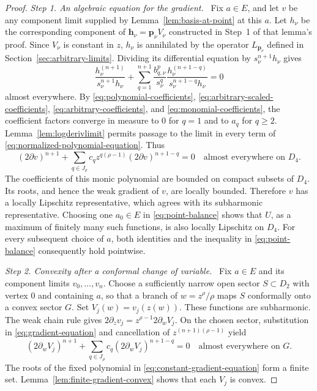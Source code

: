 \documentclass[11pt,letterpaper,reqno]{amsart}
\theoremstyle{remark}
\numberwithin{equation}{section}
\newcommand{\pv}{\bm p}
\newcommand{\hv}{\bm h}
\newcommand{\step}[1]{\medskip\noindent\emph{#1}\ }
\begin{document}
\begin{proof}
\step{Step 1. An algebraic equation for the gradient.}
Fix $a\in E$, and let $v$ be any component limit supplied by
Lemma~\ref{lem:basis-at-point} at this $a$. Let $h_\nu$ be the
corresponding component of $\hv_\nu=\pv_\nu V_\nu$ constructed in
Step~1 of that lemma's proof. Since $V_\nu$ is constant in $z$,
$h_\nu$ is annihilated by the operator $L_{\pv_\nu}$ defined in
Section~\ref{sec:arbitrary-limits}. Dividing its
differential equation by $s_\nu^{n+1} h_\nu$ gives
\begin{equation}\label{eq:normalized-polynomial-equation}
 \frac{h_\nu^{(n+1)}}{s_\nu^{n+1} h_\nu}
 +\sum_{q=1}^{n+1}\frac{b_{q,\nu}^p}{s_\nu^q}
                  \frac{h_\nu^{(n+1-q)}}{s_\nu^{n+1-q}h_\nu}=0
\end{equation}
almost everywhere. By \eqref{eq:polynomial-coefficients},
\eqref{eq:arbitrary-scaled-coefficients},
\eqref{eq:arbitrary-coefficients}, and
\eqref{eq:monomial-coefficients}, the coefficient factors converge in
measure to $0$ for $q=1$ and to $a_q$ for $q\geq2$.
Lemma~\ref{lem:logderivlimit} permits passage to the limit in every term
of \eqref{eq:normalized-polynomial-equation}. Thus
\begin{equation}\label{eq:gradient-equation}
 (2\partial v)^{n+1}+
 \sum_{q\in J_\rho}c_qz^{q(\rho-1)}(2\partial v)^{n+1-q}=0
 \quad\text{almost everywhere on }D_4.
\end{equation}
The coefficients of this monic polynomial are bounded on compact
subsets of $D_4$. Its roots, and hence the weak gradient of $v$, are
locally bounded. Therefore $v$ has a locally Lipschitz representative,
which agrees with its subharmonic representative. Choosing one
$a_0\in E$ in \eqref{eq:point-balance} shows that $U$, as a maximum of
finitely many such functions, is also locally Lipschitz on $D_4$.
For every subsequent choice of $a$, both identities and the inequality
in \eqref{eq:point-balance} consequently hold pointwise.

\step{Step 2. Convexity after a conformal change of variable.}
Fix $a\in E$ and its component limits $v_0,\ldots,v_n$.
Choose a sufficiently narrow open sector $S\subset D_2$ with vertex $0$
and containing $a$, so that a branch of $w=z^\rho/\rho$ maps $S$
conformally onto a convex sector $G$. Set $V_j(w)=v_j(z(w))$.
These functions are subharmonic. The weak chain rule gives
$2\partial_zv_j=z^{\rho-1}2\partial_wV_j$.
On the chosen sector, substitution in \eqref{eq:gradient-equation}
and cancellation of $z^{(n+1)(\rho-1)}$ yield
\begin{equation}\label{eq:constant-gradient-equation}
 (2\partial_wV_j)^{n+1}+\sum_{q\in J_\rho}c_q(2\partial_wV_j)^{n+1-q}=0
 \quad\text{almost everywhere on }G.
\end{equation}
The roots of the fixed polynomial in
\eqref{eq:constant-gradient-equation} form a finite set.
Lemma~\ref{lem:finite-gradient-convex} shows that each $V_j$ is convex.


\end{proof}
\end{document}

